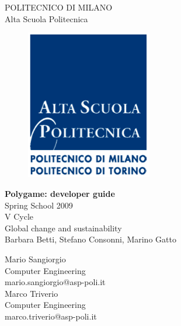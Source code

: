 \thispagestyle{empty}
\vspace*{-1.5cm} 
\begin{center}
  \large
  POLITECNICO DI MILANO\\
  \normalsize
  Alta Scuola Politecnica\\
  \begin{figure}[htbp]
    \begin{center}
      \includegraphics[width=5.5cm]{../img/logoasp.png}
    \end{center}
  \end{figure}
  \vspace*{0.3cm} \LARGE



  \textbf{Polygame: developer guide}\\



  \vspace*{.75truecm} \large
  Spring School 2009 \\
  V Cycle \\
  Global change and sustainability\\
  Barbara Betti, Stefano Consonni, Marino Gatto
  
\end{center}
\vspace*{2.0cm} \large
\begin{flushleft}



\end{flushleft}
\begin{flushright}


  Mario Sangiorgio\\Computer Engineering\\mario.sangiorgio@asp-poli.it \\ 
      Marco Triverio\\Computer Engineering\\marco.triverio@asp-poli.it \\ 


\end{flushright}
\begin{center}



\end{center} \clearpage
